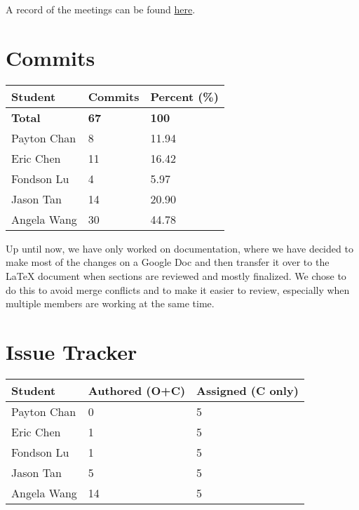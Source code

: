 \documentclass{article}
\begin{document}
A record of the meetings can be found
\href{https://github.com/PlutosCapstone/Plutos/issues?q=label%3Ameeting+is%3Aclosed}{here}.



\section{Commits}

\begin{table}[H]
\centering
\begin{tabular}{lll}
\toprule
\textbf{Student} & \textbf{Commits} & \textbf{Percent (\%)}\\
\midrule
\textbf{Total} & \textbf{67} & \textbf{100} \\
Payton Chan & 8 & 11.94\\
Eric Chen & 11 & 16.42\\
Fondson Lu & 4 & 5.97\\
Jason Tan & 14 & 20.90\\
Angela Wang & 30 & 44.78\\
\bottomrule
\end{tabular}
\end{table}

Up until now, we have only worked on documentation, where we have decided to
make most of the changes on a Google Doc and then transfer it over to the LaTeX
document when sections are reviewed and mostly finalized. We chose to do this to
avoid merge conflicts and to make it easier to review, especially when multiple
members are working at the same time.

\section{Issue Tracker}

\begin{table}[H]
\centering
\begin{tabular}{lll}
\toprule
\textbf{Student} & \textbf{Authored (O+C)} & \textbf{Assigned (C only)}\\
\midrule
Payton Chan & 0 & 5\\
Eric Chen & 1 & 5\\
Fondson Lu & 1 & 5\\
Jason Tan & 5 & 5\\
Angela Wang & 14 & 5\\
\bottomrule
\end{tabular}
\end{table}
\end{document}
